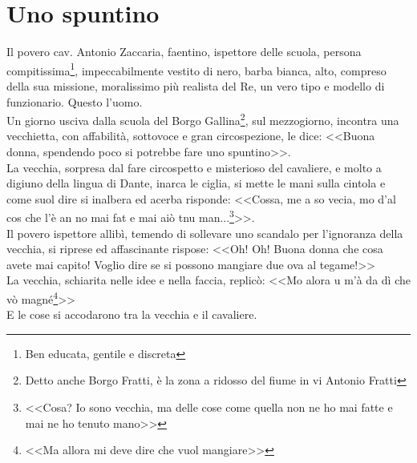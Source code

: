 
\chapter{Uno spuntino}
Il povero cav. Antonio Zaccaria, faentino, ispettore delle scuola, persona compitissima\footnote{Ben educata, gentile e discreta}, impeccabilmente vestito di nero, barba bianca, alto, compreso della sua missione, moralissimo più realista del Re, un vero tipo e modello di funzionario. Questo l'uomo.\\
\indent Un giorno usciva dalla scuola del Borgo Gallina\footnote{Detto anche Borgo Fratti, è la zona a ridosso del fiume in vi Antonio Fratti}, sul mezzogiorno, incontra una vecchietta, con affabilità, sottovoce e gran circospezione, le dice: <<Buona donna, spendendo poco si potrebbe fare uno spuntino>>.\\
\indent La vecchia, sorpresa dal fare circospetto e misterioso del cavaliere, e molto a digiuno della lingua di Dante, inarca le ciglia, si mette le mani sulla cintola e come suol dire si inalbera ed acerba risponde: <<Cossa, me a so vecia, mo d'al cos che l'è an no mai fat e mai aiò tnu man...\footnote{<<Cosa? Io sono vecchia, ma delle cose come quella non ne ho mai fatte e mai ne ho tenuto mano>>}>>.\\
\indent Il povero ispettore allibì, temendo di sollevare uno scandalo per l'ignoranza della vecchia, si riprese ed affascinante rispose: <<Oh! Oh! Buona donna che cosa avete mai capito! Voglio dire se si possono mangiare due ova al tegame!>>\\
\indent La vecchia, schiarita nelle idee e nella faccia, replicò: <<Mo alora u m'à da dì che vò magné\footnote{<<Ma allora mi deve dire che vuol mangiare>>}>>\\
\indent E le cose si accodarono tra la vecchia e il cavaliere.
